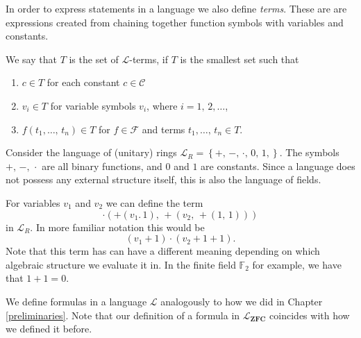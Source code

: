 \documentclass[../../main.tex]{subfiles}
\begin{document}
In order to express statements in a language we also define \textit{terms}.
These are are expressions created from chaining together function symbols with variables and constants.

\begin{definition}\cite[Definition 1.1.4]{Mar02}
    We say that $T$ is the set of $\mathcal{L}$-terms, if $T$ is the smallest set such that
    \begin{enumerate}[label=(\roman*)]
        \item $c \in T$ for each constant $c \in \mathcal{C}$
        \item $v_i \in T$ for variable symbols $v_i$, where $i = 1,\, 2,\ldots$,
        \item $f(t_1,\ldots,\, t_n) \in T$ for $f \in \mathcal{F}$ and terms $t_1,\ldots,\, t_n \in T$.
    \end{enumerate}
\end{definition}

\begin{example}
    Consider the language of (unitary) rings $\mathcal{L}_R = \left\{+,\, -,\, \cdot,\, 0,\, 1,\right\}$.
    The symbols $+,\, -,\, \cdot$ are all binary functions, and $0$ and $1$ are constants.
    Since a language does not possess any external structure itself, this is also the language of fields.

    For variables $v_1$ and $v_2$ we can define the term
    $$\cdot \left(+ \left(v_1.\, 1\right),\, +\left(v_2,\, +\left(1,\, 1\right)\right)\right)$$
    in $\mathcal{L}_R$.
    In more familiar notation this would be
    $$\left(v_1 + 1\right) \cdot \left(v_2 + 1 + 1\right).$$
    Note that this term has can have a different meaning depending on which algebraic structure we evaluate it in.
    In the finite field $\mathbb{F}_2$ for example, we have that $1 + 1 = 0$.
\end{example}

We define formulas in a language $\mathcal{L}$ analogously to how we did in Chapter \ref{preliminaries}.
Note that our definition of a formula in $\mathcal{L}_{\textbf{ZFC}}$ coincides with how we defined it before.
\end{document}
